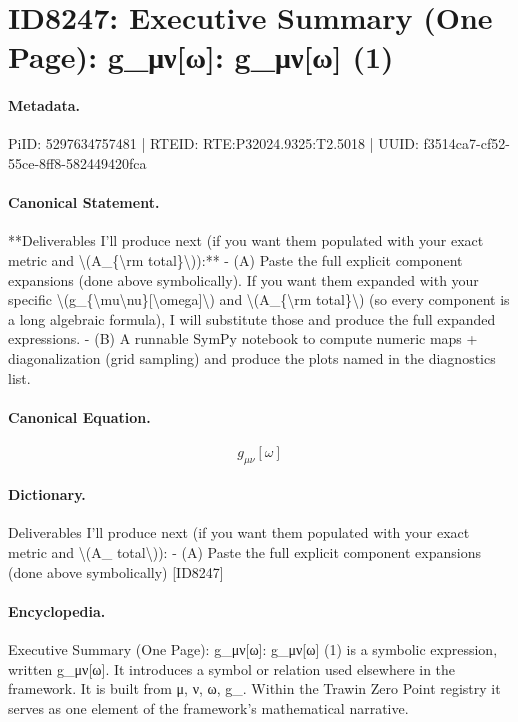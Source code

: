 \section*{ID8247: Executive Summary (One Page): g\_μν[ω]: g\_μν[ω] (1)}
\paragraph{Metadata.}
PiID: 5297634757481 | RTEID: RTE:P32024.9325:T2.5018 | UUID: f3514ca7-cf52-55ce-8ff8-582449420fca

\paragraph{Canonical Statement.}
**Deliverables I’ll produce next (if you want them populated with your exact metric and \textbackslash{}(A\_\{\textbackslash{}rm total\}\textbackslash{})):** - (A) Paste the full explicit component expansions (done above symbolically). If you want them expanded with your specific \textbackslash{}(g\_\{\textbackslash{}mu\textbackslash{}nu\}[\textbackslash{}omega]\textbackslash{}) and \textbackslash{}(A\_\{\textbackslash{}rm total\}\textbackslash{}) (so every component is a long algebraic formula), I will substitute those and produce the full expanded expressions. - (B) A runnable SymPy notebook to compute numeric maps + diagonalization (grid sampling) and produce the plots named in the diagnostics list.

\paragraph{Canonical Equation.}
\[
g_{\mu\nu}[\omega]
\]

\paragraph{Dictionary.}
Deliverables I’ll produce next (if you want them populated with your exact metric and \textbackslash{}(A\_ total\textbackslash{})): - (A) Paste the full explicit component expansions (done above symbolically) [ID8247]

\paragraph{Encyclopedia.}
Executive Summary (One Page): g\_μν[ω]: g\_μν[ω] (1) is a symbolic expression, written g\_μν[ω]. It introduces a symbol or relation used elsewhere in the framework. It is built from μ, ν, ω, g\_. Within the Trawin Zero Point registry it serves as one element of the framework's mathematical narrative.
